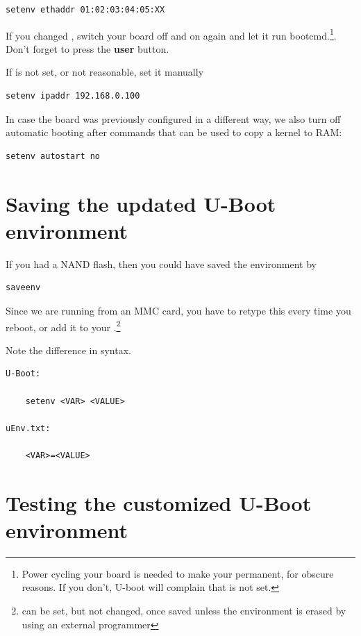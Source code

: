 \begin{verbatim}
setenv ethaddr 01:02:03:04:05:XX
\end{verbatim}

If you changed , switch your board off and on again and let it run bootcmd.\footnote{Power cycling your board is needed to make your  permanent, for obscure
  reasons. If you don't, U-boot will complain that  is not
  set.}. Don't forget to press the {\bf user} button.

If  is not set, or not reasonable, set it manually

\begin{verbatim}
setenv ipaddr 192.168.0.100
\end{verbatim}

In case the board was previously configured in a different way, we
also turn off automatic booting after commands that can be used to
copy a kernel to RAM:

\begin{verbatim}
setenv autostart no
\end{verbatim}

\clearpage
\section{Saving the updated U-Boot environment}

If you had a NAND flash, then you could have saved the environment by

\begin{verbatim}
saveenv
\end{verbatim}

Since we are running from an MMC card, you have to retype this every time you reboot,
or add it to your .\footnote{ can be set, but not changed,
once saved unless the environment is erased by using an external programmer}

Note the difference in syntax.
\begin{lstlisting}
U-Boot:

	setenv <VAR> <VALUE>

uEnv.txt:

	<VAR>=<VALUE>

\end{lstlisting}

\section{Testing the customized U-Boot environment}

